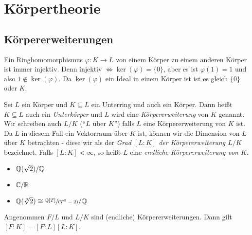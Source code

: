 \graphicspath{{Images/}}

\chapter{Körpertheorie}

\section{Körpererweiterungen}
\begin{remark}
	Ein Ringhomomorphismus $\varphi: K \to L$ von einem Körper zu einem anderen Körper ist immer injektiv.
	Denn injektiv $\Leftrightarrow \ker(\varphi) = \{0\}$, aber es ist $\varphi(1) = 1$ und also $1 \not\in \ker(\varphi)$.
	Da $\ker(\varphi)$ ein Ideal in einem Körper ist ist es gleich $\{0\}$ oder $K$.
\end{remark}

\begin{definition}
	Sei $L$ ein Körper und $K \subseteq L$ ein Unterring und auch ein Körper.
	Dann heißt $K \subseteq L$ auch ein \emph{Unterkörper} und $L$ wird eine \emph{Körpererweiterung} von  $K$ genannt.
	Wir schreiben auch $L / K$ (\enquote{$L$ über $K$}) falls $L$ eine Körpererweiterung von $K$ ist.
	Da $L$ in diesem Fall ein Vektorraum über $K$ ist, können wir die Dimension von $L$ über $K$ betrachten -
	diese wir als der \emph{Grad $[L:K]$ der Körpererweiterung  $L / K$} bezeichnet.
	Falls $[L:K] < \infty$, so heißt $L$ eine \emph{endliche Körpererweiterung von $K$}.
\end{definition}

\begin{eg}
	\begin{itemize}
		\item $\mathbb{Q}(\sqrt{2}) / \mathbb{Q}$
		\item $\mathbb{C} / \mathbb{R}$ 
		\item $\mathbb{Q}(\sqrt[3]{2} ) \cong \sfrac[3]{\mathbb{Q}[T]}{(T^3-2)} / \mathbb{Q} $
	\end{itemize}
\end{eg}

\begin{theorem}
	Angenommen $F / L $ und $L / K$ sind (endliche) Körpererweiterungen.
	Dann gilt $[F:K] = [F:L] [L:K]$.
\end{theorem}

